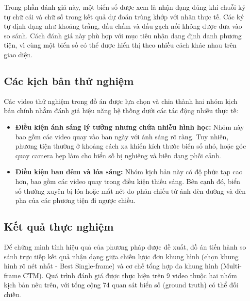 \documentclass[../DoAn.tex]{subfiles}
\begin{document}
Trong phần đánh giá này, một biển số được xem là nhận dạng đúng khi chuỗi ký tự chữ cái và chữ số trong kết quả dự đoán trùng khớp với nhãn thực tế. Các ký tự định dạng như khoảng trắng, dấu chấm và dấu gạch nối không được đưa vào so sánh. Cách đánh giá này phù hợp với mục tiêu nhận dạng định danh phương tiện, vì cùng một biển số có thể được hiển thị theo nhiều cách khác nhau trên giao diện.

\subsection{Các kịch bản thử nghiệm}
\label{subsection:5.3.1}

Các video thử nghiệm trong đồ án được lựa chọn và chia thành hai nhóm kịch bản chính nhằm đánh giá hiệu năng hệ thống dưới các tác động nhiễu thực tế:
\begin{itemize}
    \item \textbf{Điều kiện ánh sáng lý tưởng nhưng chứa nhiễu hình học:} Nhóm này bao gồm các video quay vào ban ngày với ánh sáng rõ ràng. Tuy nhiên, phương tiện thường ở khoảng cách xa khiến kích thước biển số nhỏ, hoặc góc quay camera hẹp làm cho biển số bị nghiêng và biến dạng phối cảnh.
    \item \textbf{Điều kiện ban đêm và lóa sáng:} Nhóm kịch bản này có độ phức tạp cao hơn, bao gồm các video quay trong điều kiện thiếu sáng. Bên cạnh đó, biển số thường xuyên bị lóa hoặc mất nét do phản chiếu từ ánh đèn đường và đèn pha của các phương tiện đi ngược chiều.
\end{itemize}

\subsection{Kết quả thực nghiệm}
\label{subsection:5.3.2}

Để chứng minh tính hiệu quả của phương pháp được đề xuất, đồ án tiến hành so sánh trực tiếp kết quả nhận dạng giữa chiến lược đơn khung hình (chọn khung hình rõ nét nhất - Best Single-frame) và cơ chế tổng hợp đa khung hình (Multi-frame CTM). Quá trình đánh giá được thực hiện trên 9 video thuộc hai nhóm kịch bản nêu trên, với tổng cộng 74 quan sát biển số (ground truth) có thể đối chiếu.
\end{document}
